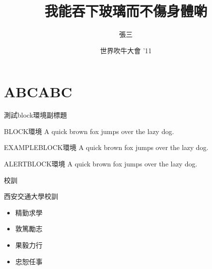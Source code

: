\documentclass{ctexbeamer}
\title[演示短標題]
{我能吞下玻璃而不傷身體喲}
\author[multiple1902]
{張三} %
\institute[Xi'an Jiaotong University] %
{
  西安交通大學
}
\date[Short Occasion] %
{世界吹牛大會 '11}
\begin{document}
\begin{frame}
  \titlepage
\end{frame}


\part{ABCABC}


\begin{frame}{測試block環境}{副標題}
    \begin{block}{BLOCK環境}
        A quick brown fox jumps over the lazy dog.
    \end{block} \pause

    \begin{exampleblock}{EXAMPLEBLOCK環境}
        A quick brown fox jumps over the lazy dog.
    \end{exampleblock} \pause

    \begin{alertblock}{ALERTBLOCK環境}
        A quick brown fox jumps over the lazy dog.
    \end{alertblock} 
\end{frame}

\begin{frame}{校訓}

    \begin{block}{西安交通大學校訓}
        \centering \Huge
        \begin{itemize}[<+->]
            \item 精勤求學
            \item 敦篤勵志
            \item 果毅力行
            \item 忠恕任事
        \end{itemize}
    \end{block}

\end{frame}
\end{document}
